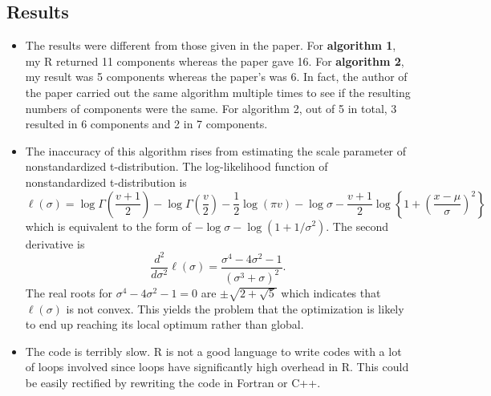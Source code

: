 \documentclass[11pt]{article}
\begin{document}
\subsection{Results}
\begin{itemize}
  \item The results were different from those given in the paper. For \textbf{algorithm 1}, my R returned 11 components whereas the paper gave 16. For \textbf{algorithm 2}, my result was 5 components whereas the paper's was 6. In fact, the author of the paper carried out the same algorithm multiple times to see if the resulting numbers of components were the same. For algorithm 2, out of 5 in total, 3 resulted in 6 components and 2 in 7 components.
  \item The inaccuracy of this algorithm rises from estimating the scale parameter of nonstandardized t-distribution. The log-likelihood function of nonstandardized t-distribution is
  $$
    \ell\left(\sigma \right) = \log \Gamma \left(\frac{v+1}{2} \right) - \log \Gamma \left(\frac{v}{2} \right) - \frac{1}{2} \log \left(\pi v \right) - \log \sigma - \frac{v+1}{2} \log \left\{1 + \left(\frac{x-\mu}{\sigma} \right)^{2} \right\}
  $$
  which is equivalent to the form of $-\log \sigma - \log \left(1 + 1/\sigma^{2} \right)$. The second derivative is
  $$
    \frac{d^{2}}{d\sigma^{2}}\ell \left(\sigma \right) = \frac{\sigma^{4} - 4\sigma^{2} -1}{\left(\sigma^{3} + \sigma \right)^{2}}.
  $$
  The real roots for $\sigma^{4}-4\sigma^{2}-1=0$ are $\pm \sqrt{2 + \sqrt{5}}$ which indicates that $\ell \left(\sigma \right)$ is not convex. This yields the problem that the optimization is likely to end up reaching its local optimum rather than global.
  \item The code is terribly slow. R is not a good language to write codes with a lot of loops involved since loops have significantly high overhead in R. This could be easily rectified by rewriting the code in Fortran or C++.
\end{itemize}
\end{document}
